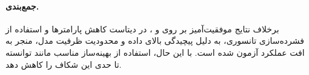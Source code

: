 \paragraph{جمع‌بندی.} برخلاف نتایج موفقیت‌آمیز بر روی  و ، در دیتاست  کاهش پارامترها و استفاده از فشرده‌سازی تانسوری، به دلیل پیچیدگی بالای داده و محدودیت ظرفیت مدل، منجر به افت عملکرد آزمون شده است. با این حال، استفاده از بهینه‌ساز مناسب مانند  توانسته تا حدی این شکاف را کاهش دهد.










